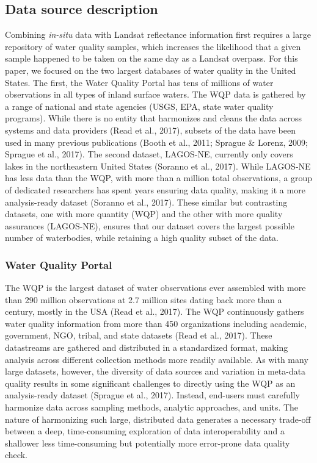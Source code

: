 \documentclass[]{article}
\begin{document}
\hypertarget{data-source-description}{%
\subsection{Data source description}\label{data-source-description}}

Combining \emph{in-situ} data with Landsat reflectance information first
requires a large repository of water quality samples, which increases
the likelihood that a given sample happened to be taken on the same day
as a Landsat overpass. For this paper, we focused on the two largest
databases of water quality in the United States. The first, the Water
Quality Portal has tens of millions of water observations in all types
of inland surface waters. The WQP data is gathered by a range of
national and state agencies (USGS, EPA, state water quality programs).
While there is no entity that harmonizes and cleans the data across
systems and data providers (Read et al., 2017), subsets of the data have
been used in many previous publications (Booth et al., 2011; Sprague \&
Lorenz, 2009; Sprague et al., 2017). The second dataset, LAGOS-NE,
currently only covers lakes in the northeastern United States (Soranno
et al., 2017). While LAGOS-NE has less data than the WQP, with more than
a million total observations, a group of dedicated researchers has spent
years ensuring data quality, making it a more analysis-ready dataset
(Soranno et al., 2017). These similar but contrasting datasets, one with
more quantity (WQP) and the other with more quality assurances
(LAGOS-NE), ensures that our dataset covers the largest possible number
of waterbodies, while retaining a high quality subset of the data.

\hypertarget{water-quality-portal}{%
\subsubsection{Water Quality Portal}\label{water-quality-portal}}

The WQP is the largest dataset of water observations ever assembled with
more than 290 million observations at 2.7 million sites dating back more
than a century, mostly in the USA (Read et al., 2017). The WQP
continuously gathers water quality information from more than 450
organizations including academic, government, NGO, tribal, and state
datasets (Read et al., 2017). These datastreams are gathered and
distributed in a standardized format, making analysis across different
collection methods more readily available. As with many large datasets,
however, the diversity of data sources and variation in meta-data
quality results in some significant challenges to directly using the WQP
as an analysis-ready dataset (Sprague et al., 2017). Instead, end-users
must carefully harmonize data across sampling methods, analytic
approaches, and units. The nature of harmonizing such large, distributed
data generates a necessary trade-off between a deep, time-consuming
exploration of data interoperability and a shallower less time-consuming
but potentially more error-prone data quality check.
\end{document}
